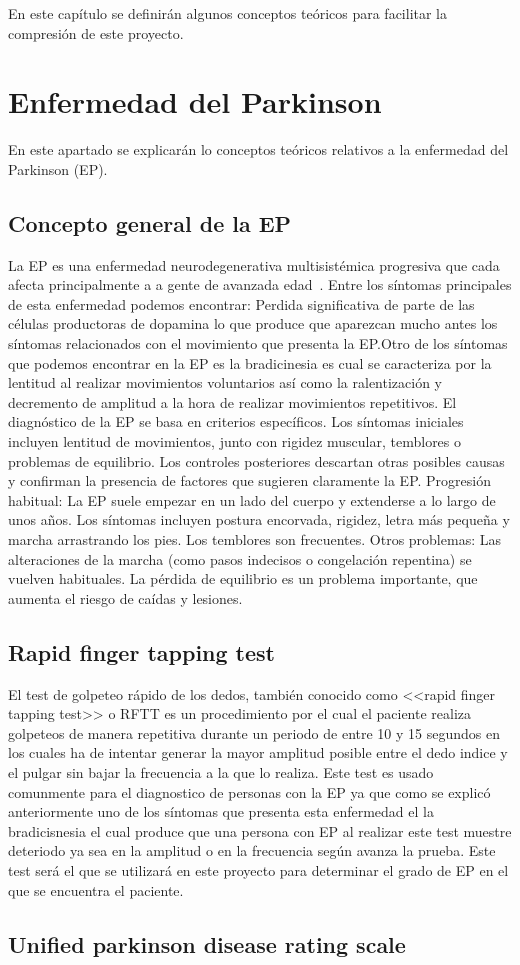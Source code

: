 
En este capítulo se definirán algunos conceptos teóricos para facilitar la compresión de este proyecto.

\section{Enfermedad del Parkinson}

En este apartado se explicarán lo conceptos teóricos relativos a la enfermedad del Parkinson (EP).
\subsection{Concepto general de la EP}
La EP es una  enfermedad neurodegenerativa multisistémica progresiva que cada afecta principalmente a a gente de avanzada edad~\cite{pdsymptoms}.  
Entre los síntomas principales de esta enfermedad podemos encontrar:
Perdida significativa de parte de las células productoras de dopamina lo que produce que aparezcan mucho antes los síntomas relacionados con el movimiento que presenta la EP.Otro de los síntomas que podemos encontrar en la EP es la bradicinesia es cual se caracteriza por la lentitud al realizar movimientos voluntarios así como la ralentización y decremento de amplitud a la hora de realizar movimientos repetitivos.
El diagnóstico de la EP se basa en criterios específicos. Los síntomas iniciales incluyen lentitud de movimientos, junto con rigidez muscular, temblores o problemas de equilibrio. Los controles posteriores descartan otras posibles causas y confirman la presencia de factores que sugieren claramente la EP.
Progresión habitual: La EP suele empezar en un lado del cuerpo y extenderse a lo largo de unos años. Los síntomas incluyen postura encorvada, rigidez, letra más pequeña y marcha arrastrando los pies. Los temblores son frecuentes.
Otros problemas: Las alteraciones de la marcha (como pasos indecisos o congelación repentina) se vuelven habituales. La pérdida de equilibrio es un problema importante, que aumenta el riesgo de caídas y lesiones.

\subsection{Rapid finger tapping test}

El test de golpeteo rápido de los dedos, también conocido como <<rapid finger tapping test>> o RFTT es un procedimiento por el cual el paciente realiza golpeteos de manera repetitiva durante un periodo de entre 10 y 15 segundos en los cuales ha de intentar generar la mayor amplitud posible entre el dedo indice y el pulgar sin bajar la frecuencia a la que lo realiza. Este test es usado comunmente para el diagnostico de personas con la EP ya que como se explicó anteriormente uno de los síntomas que presenta esta enfermedad el la bradicisnesia el cual produce que una persona con EP al realizar este test muestre deteriodo ya sea en la amplitud o en la frecuencia según avanza la prueba. Este test será el que se utilizará en este proyecto para determinar el grado de EP en el que se encuentra el paciente.

\subsection{Unified parkinson disease rating scale}
